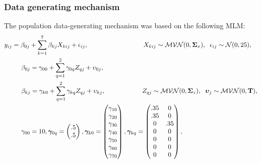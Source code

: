 \documentclass[10pt, a4paper, titlepage]{article}
\begin{document}
\subsubsection{Data generating mechanism}
The population data-generating mechanism was based on the following MLM:
\begin{subequations}
\label{eq:population}
\begin{align}
        y_{ij} &= \beta_{0j} + \sum_{k=1}^{7}\beta_{kj}X_{kij} + \epsilon_{ij}, \hspace{3cm} X_{kij} \sim \mathcal{MVN}(0, \boldsymbol{\Sigma}_{x}), \hspace{.2cm} \epsilon_{ij} \sim \mathcal{N}(0, 25), \label{eq:population1} \\
        &\hspace{.5cm}\beta_{0j} = \gamma_{00} + \sum_{q=1}^{2}\gamma_{0q}Z_{qj} + \upsilon_{0j}, \label{eq:beta0}\\
        &\hspace{.5cm}\beta_{kj} = \gamma_{k0} + \sum_{q=1}^{2}\gamma_{kq}Z_{qj} + \upsilon_{kj}, \hspace{2cm} Z_{qj} \sim \mathcal{MVN}(0, \boldsymbol{\Sigma}_{z}), \hspace{.2cm} \boldsymbol{\upsilon}_{j} \sim \mathcal{MVN}(0, \mathbf{T}), \label{eq:betak} \\
        &\hspace{.5cm}\gamma_{00} = 10, \boldsymbol{\gamma}_{0q} = \begin{pmatrix}
        .5 \\ .5
        \end{pmatrix}, \boldsymbol{\gamma}_{k0} = \begin{pmatrix}
        \gamma_{10} \\ \gamma_{20} \\ \gamma_{30} \\ \gamma_{40} \\ \gamma_{50} \\ \gamma_{60} \\ \gamma_{70}
        \end{pmatrix}, \boldsymbol{\gamma}_{kq} = \begin{pmatrix}
        .35 & 0 \\ .35 & 0 \\ 0 & .35 \\ 0 & 0 \\ 0 & 0 \\ 0 & 0 \\ 0 & 0
        \end{pmatrix}, \\

\end{align}
\end{subequations}
\end{document}
